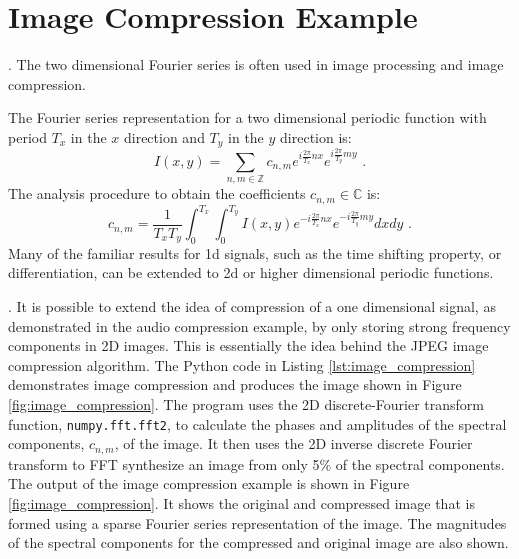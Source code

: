 \newpage
\section{Image Compression Example}
. The two
dimensional Fourier series is often used in image processing and image
compression.

The Fourier series representation for a two dimensional periodic
function with period $T_x$ in the $x$ direction and $T_y$ in the $y$
direction is:
\begin{equation}
I(x,y) = \sum_{n,m \in \mathbb{Z}} c_{n,m} e^{i \frac{2\pi}{T_x}nx} e^{i \frac{2\pi}{T_y}my} \,\,.
\end{equation}
The analysis procedure to obtain the coefficients $c_{n,m}\in \mathbb{C}$ is:
\begin{equation}
c_{n,m} = \frac{1}{T_x T_y}\int_{0}^{T_x}\int_0^{T_y} I(x,y) e^{-i \frac{2\pi}{T_x}nx} e^{-i \frac{2\pi}{T_y}my}dx dy \,\,.
\label{eq:2d_analysis}
\end{equation}
Many of the familiar results for 1d signals, such as the time shifting
property, or differentiation, can be extended to 2d or higher
dimensional periodic functions. 


.  It is possible to
extend the idea of compression of a one dimensional signal, as
demonstrated in the audio compression example, by only storing strong
frequency components in 2D images. This is essentially the idea
behind the JPEG image compression algorithm.  The Python code in
Listing \ref{lst:image_compression} demonstrates image compression and
produces the image shown in Figure \ref{fig:image_compression}. The
program uses the 2D discrete-Fourier transform function,
\verb|numpy.fft.fft2|, to calculate the phases and amplitudes of the
spectral components, $c_{n,m}$, of the image. It then uses the 2D
inverse discrete Fourier transform to FFT synthesize an image from
only 5\% of the spectral components. The output of the image
compression example is shown in Figure \ref{fig:image_compression}. It
shows the original and compressed image that is formed using a sparse
Fourier series representation of the image. The magnitudes of the
spectral components for the compressed and original image are also
shown.

